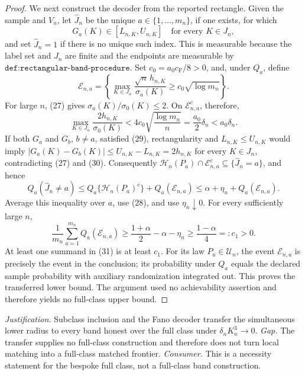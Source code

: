 \documentclass{article}
\begin{document}
\begin{proof}
We next construct the decoder from the reported rectangle.  Given the sample and \(V_n\), let \(\widehat J_n\) be the unique \(a\in\{1,\ldots,m_n\}\), if one exists, for which
\[
 G_a(K)\in[L_{n,K},U_{n,K}]\quad\text{for every }K\in J_n,  \tag{29}
\]
and set \(\widehat J_n=1\) if there is no unique such index.  This is measurable because the label set and \(J_n\) are finite and the endpoints are measurable by \(\texttt{def:rectangular-band-procedure}\).  Set \(c_0=a_0c_{\mathrm F}/8>0\), and, under \(Q_a\), define
\[
 \mathcal E_{n,a}=
 \left\{\max_{K\in J_n}
 \frac{\sqrt n\,h_{n,K}}{\sigma_a(K)}
 \geq c_0\sqrt{\log m_n}\right\}.
\]
For large \(n\), (27) gives \(\sigma_a(K)/\sigma_0(K)\leq2\).  On \(\mathcal E_{n,a}^{c}\), therefore,
\[
 \max_{K\in J_n}\frac{2h_{n,K}}{\sigma_0(K)}
 <4c_0\sqrt{\frac{\log m_n}{n}}
 =\frac{a_0}{2}\delta_n<a_0\delta_n.                         \tag{30}
\]
If both \(G_a\) and \(G_b\), \(b\neq a\), satisfied (29), rectangularity and \(L_{n,K}\leq U_{n,K}\) would imply \(|G_a(K)-G_b(K)|\leq U_{n,K}-L_{n,K}=2h_{n,K}\) for every \(K\in J_n\), contradicting (27) and (30).  Consequently \(\mathcal H_n(P_a)\cap\mathcal E_{n,a}^{c}\subseteq\{\widehat J_n=a\}\), and hence
\[
 Q_a(\widehat J_n\neq a)
 \leq Q_a\{\mathcal H_n(P_a)^c\}+Q_a(\mathcal E_{n,a})
 \leq\alpha+\eta_n+Q_a(\mathcal E_{n,a}).
\]
Average this inequality over \(a\), use (28), and use \(\eta_n\downarrow0\).  For every sufficiently large \(n\),
\[
 \frac1{m_n}\sum_{a=1}^{m_n}Q_a(\mathcal E_{n,a})
 \geq\frac{1+\alpha}{2}-\alpha-\eta_n
 \geq\frac{1-\alpha}{4}=:c_1>0.                              \tag{31}
\]
At least one summand in (31) is at least \(c_1\).  For its law \(P_a\in\mathcal U_n\), the event \(\mathcal E_{n,a}\) is precisely the event in the conclusion; its probability under \(Q_a\) equals the declared sample probability with auxiliary randomization integrated out.  This proves the transferred lower bound.  The argument used no achievability assertion and therefore yields no full-class upper bound.
\end{proof}
\par\smallskip\noindent \textit{Justification.} Subclass inclusion and the Fano decoder transfer the simultaneous lower radius to every band honest over the full class under \(\delta_nK_n^3\to0\). \textit{Gap.} The transfer supplies no full-class construction and therefore does not turn local matching into a full-class matched frontier. \textit{Consumer.} This is a necessity statement for the bespoke full class, not a full-class band construction.
\end{document}
